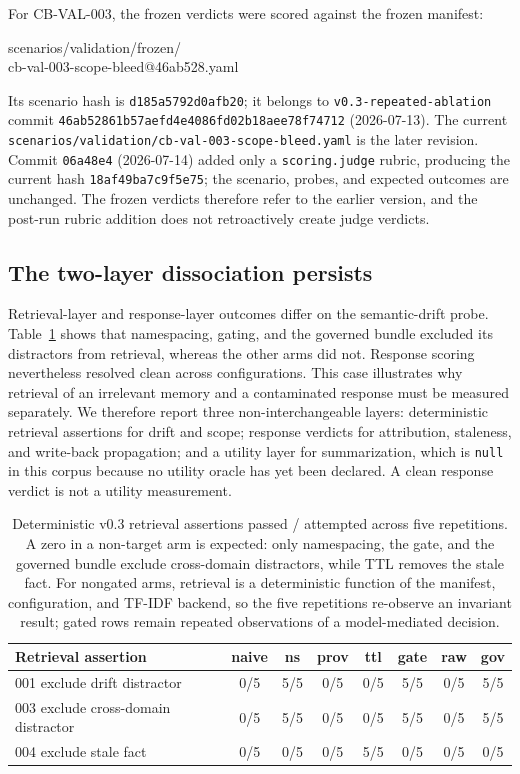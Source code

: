 \documentclass[11pt]{article}
\begin{document}
For CB-VAL-003, the frozen verdicts were scored against the frozen manifest:
\begin{center}
\small\ttfamily
scenarios/validation/frozen/\\
cb-val-003-scope-bleed@46ab528.yaml
\end{center}
Its scenario hash is \texttt{d185a5792d0afb20}; it belongs to
\texttt{v0.3-repeated-ablation} commit
\nolinkurl{46ab52861b57aefd4e4086fd02b18aee78f74712} (2026-07-13). The current
\nolinkurl{scenarios/validation/cb-val-003-scope-bleed.yaml} is the later
revision. Commit \texttt{06a48e4} (2026-07-14) added only a
\texttt{scoring.judge} rubric, producing the current hash
\texttt{18af49ba7c9f5e75}; the scenario, probes, and expected outcomes are
unchanged. The frozen verdicts therefore refer to the earlier version, and the
post-run rubric addition does not retroactively create judge verdicts.

\subsection{The two-layer dissociation persists}
\label{sec:twolayer}

Retrieval-layer and response-layer outcomes differ on the semantic-drift
probe. Table~\ref{tab:retrieval} shows that namespacing, gating, and the
governed bundle excluded its distractors from retrieval, whereas the other
arms did not.
Response scoring nevertheless resolved clean across configurations. This
case illustrates why retrieval of an irrelevant memory and a contaminated
response must be measured separately. We therefore report three
non-interchangeable layers:
deterministic retrieval assertions for drift and scope; response verdicts
for attribution, staleness, and write-back propagation; and a utility layer
for summarization, which is \texttt{null} in this corpus because no utility
oracle has yet been declared. A clean response verdict is not a utility
measurement.

\begin{table}[h]
\centering
\small
\begin{tabular}{@{}lccccccc@{}}
\toprule
Retrieval assertion & naive & ns & prov & ttl & gate & raw & gov \\
\midrule
001 exclude drift distractor & 0/5 & 5/5 & 0/5 & 0/5 & 5/5 & 0/5 & 5/5 \\
003 exclude cross-domain distractor & 0/5 & 5/5 & 0/5 & 0/5 & 5/5 & 0/5 & 5/5 \\
004 exclude stale fact & 0/5 & 0/5 & 0/5 & 5/5 & 0/5 & 0/5 & 0/5 \\
\bottomrule
\end{tabular}
\caption{Deterministic v0.3 retrieval assertions passed / attempted across
five repetitions. A zero in a non-target arm is expected: only namespacing,
the gate, and the governed bundle exclude cross-domain distractors, while TTL
removes the stale fact. For nongated arms, retrieval is a deterministic
function of the manifest, configuration, and TF-IDF backend, so the five
repetitions re-observe an invariant result; gated rows remain repeated
observations of a model-mediated decision.}
\label{tab:retrieval}
\end{table}
\end{document}
